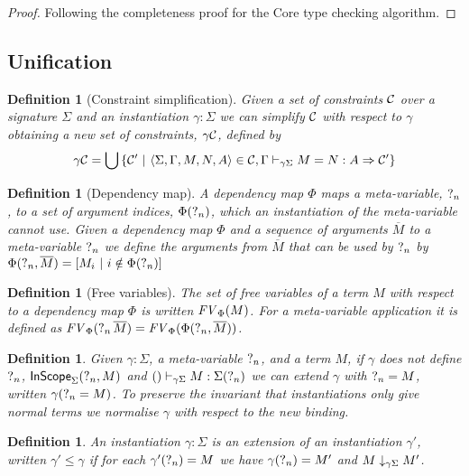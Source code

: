 \documentclass[11pt]{article}
\newtheorem{definition}[theorem]{Definition}
\begin{document}
\begin{proof}
    Following the completeness proof for the Core type checking algorithm.
\end{proof}

\subsection{Unification}

\begin{definition}[Constraint simplification]
    Given a set of constraints $\C$ over a signature $\Sigma$ and an
    instantiation $\gamma:\Sigma$ we can simplify $\C$ with respect to $\gamma$
    obtaining a new set of constraints, $\Simplify\gamma\C$, defined by
    \[
	\Simplify\gamma\C = \bigcup\,\{\C' ~|~ \Constr\Sigma\Gamma MNA\in\C, \EqualIS{\C'}{\gamma\Sigma}\Gamma MNA\}
    \]
\end{definition}

\begin{definition}[Dependency map]
    A {\em dependency map} $\Phi$ maps a meta-variable, $\Meta n$, to a set of
    argument indices, $\PhiSet n$, which an instantiation of the meta-variable
    cannot use.  Given a dependency map $\Phi$ and a sequence of arguments
    $\overline M$ to a meta-variable $\Meta n$ we define the arguments from
    $\overline M$ that can be used by $\Meta n$ by
    \(\PhiArgs n{\overline M} = [ M_i ~|~ i\notin\PhiSet n]\)
\end{definition}

\begin{definition}[Free variables]
    The set of free variables of a term $M$ with respect to a dependency map
    $\Phi$ is written $\FV\Phi M$. For a meta-variable application it is defined as
    $\FV\Phi{\Meta n\,\overline M} = \FV\Phi{\PhiArgs n{\overline M}}$.
\end{definition}

\begin{definition}
    Given $\gamma:\Sigma$, a meta-variable $\Meta n$, and a term $M$, if
    $\gamma$ does not define $\Meta n$, $\InScope\Sigma{\Meta n}M$ and
    $\HasTypeCS{\gamma\Sigma}{()}M{\Sigma(\Meta n)}$ we can extend $\gamma$
    with $\Meta n = M$, written $\SubstUpdate\gamma nM$. To preserve the
    invariant that instantiations only give normal terms we normalise $\gamma$
    with respect to the new binding.
\end{definition}

\begin{definition}
    An instantiation $\gamma:\Sigma$ is an extension of an instantiation $\gamma'$,
    written $\gamma'\leq\gamma$ if for each $\gamma'(\Meta n) = M$ we have
    $\gamma(\Meta n) = M'$ and $\Normalise{\gamma\Sigma}M{M'}$.
\end{definition}
\end{document}

